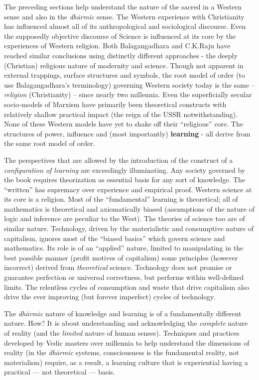 The preceding sections help understand the nature of the sacred in a Western sense and also in the \textit{dhārmic} sense. The Western experience with Christianity has influenced almost all of its anthropological and sociological discourse. Even the supposedly objective discourse of Science is influenced at its core by the experiences of Western religion. Both Balagangadhara and C.K.Raju have reached similar conclusions using distinctly different approaches - the deeply (Christian) religious nature of modernity and science. Though not apparent in external trappings, surface structures and symbols, the root model of order (to use Balagangadhara's terminology) governing Western society today is the same – \textit{religion} (Christianity) – since nearly two millennia. Even the superficially secular socio-models of Marxism have primarily been theoretical constructs with relatively shallow practical impact (the reign of the USSR notwithstanding). None of these Western models have yet to shake off their “religious” core. The structures of power, influence and (most importantly) \textbf{learning} - all derive from the same root model of order.

The perspectives that are allowed by the introduction of the construct of a \textit{configuration of learning} are exceedingly illuminating. Any society governed by the book requires theorization as essential basis for any sort of knowledge. The “written” has supremacy over experience and empirical proof. Western science at its core is a religion. Most of the “fundamental” learning is theoretical; all of mathematics is theoretical and axiomatically biased (assumptions of the nature of logic and inference are peculiar to the West). The theories of science too are of similar nature. Technology, driven by the materialistic and consumptive nature of capitalism, ignores most of the “biased basics” which govern science and mathematics. Its role is of an “applied” nature, limited to manipulating in the best possible manner (profit motives of capitalism) some principles (however incorrect) derived from \textit{theoretical} science. Technology does not promise or guarantee perfection or universal correctness, but performs within well-defined limits. The relentless cycles of consumption and waste that drive capitalism also drive the ever improving (but forever imperfect) cycles of technology.

The \textit{dhārmic} nature of knowledge and learning is of a fundamentally different nature. How? It is about understanding and acknowledging the \textit{complete} nature of reality (and the \textit{limited} nature of human senses). Techniques and practices developed by Vedic masters over millennia to help understand the dimensions of reality (in the \textit{dhārmic} systems, consciousness is the fundamental reality, not materialism) require, as a result, a learning culture that is experiential having a practical — not theoretical — basis.

